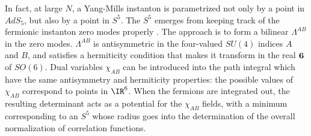 In fact, at large $N$, a Yang-Mills instanton is parametrized not only by a
point in $AdS_5$, but also by a point in $S^5$.  The $S^5$ emerges from
keeping track of the fermionic instanton zero modes properly
\cite{Dorey:1999pd}.  The approach is to form a bilinear $\Lambda^{AB}$ in
the zero modes.  $\Lambda^{AB}$ is antisymmetric in the four-valued $SU(4)$
indices $A$ and $B$, and satisfies a hermiticity condition that makes it
transform in the real ${\bf 6}$ of $SO(6)$.  Dual variables $\chi_{AB}$ can
be introduced into the path integral which have the same antisymmetry and
hermiticity properties: the possible values of $\chi_{AB}$ correspond to
points in $\IR^6$.  When the fermions are integrated out, the resulting
determinant acts as a potential for the $\chi_{AB}$ fields, with a minimum
corresponding to an $S^5$ whose radius goes into the determination of
the overall
normalization of correlation functions.

